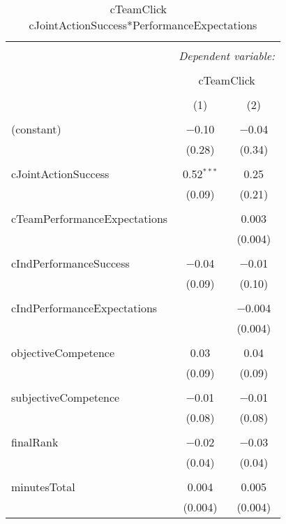 
\begin{table}[!htbp] \centering 
  \caption{cTeamClick ~ cJointActionSuccess*PerformanceExpectations} 
  \label{tab:MLM21ccTeamPerfExpcClickInt} 
\footnotesize 
\begin{tabular}{@{\extracolsep{5pt}}lcc} 
\\[-1.8ex]\hline 
\hline \\[-1.8ex] 
 & \multicolumn{2}{c}{\textit{Dependent variable:}} \\ 
\cline{2-3} 
\\[-1.8ex] & \multicolumn{2}{c}{cTeamClick} \\ 
\\[-1.8ex] & (1) & (2)\\ 
\hline \\[-1.8ex] 
 (constant) & $-$0.10 & $-$0.04 \\ 
  & (0.28) & (0.34) \\ 
  & & \\ 
 cJointActionSuccess & 0.52$^{***}$ & 0.25 \\ 
  & (0.09) & (0.21) \\ 
  & & \\ 
 cTeamPerformanceExpectations &  & 0.003 \\ 
  &  & (0.004) \\ 
  & & \\ 
 cIndPerformanceSuccess & $-$0.04 & $-$0.01 \\ 
  & (0.09) & (0.10) \\ 
  & & \\ 
 cIndPerformanceExpectations &  & $-$0.004 \\ 
  &  & (0.004) \\ 
  & & \\ 
 objectiveCompetence & 0.03 & 0.04 \\ 
  & (0.09) & (0.09) \\ 
  & & \\ 
 subjectiveCompetence & $-$0.01 & $-$0.01 \\ 
  & (0.08) & (0.08) \\ 
  & & \\ 
 finalRank & $-$0.02 & $-$0.03 \\ 
  & (0.04) & (0.04) \\ 
  & & \\ 
 minutesTotal & 0.004 & 0.005 \\ 
  & (0.004) & (0.004) \\ 

\end{tabular}
\end{table}
